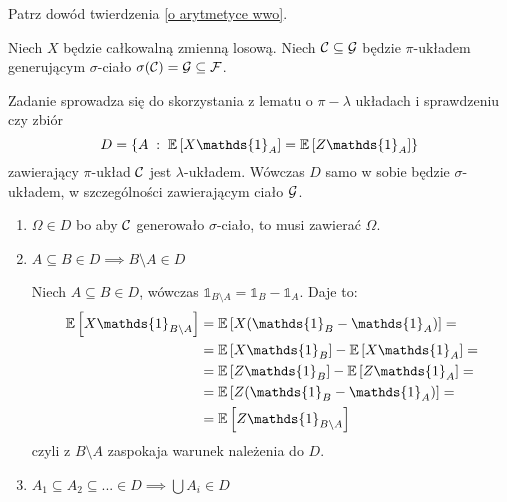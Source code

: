 \begin{solution}
  Patrz dowód twierdzenia \ref{o arytmetyce wwo}.
\end{solution}

\begin{problem}
  Niech $X$ będzie całkowalną zmienną losową. Niech $\mathcal{C}\subseteq\mathcal{G}$ będzie $\pi$-układem generującym $\sigma$-ciało $\sigma(\mathcal{C})=\mathcal{G}\subseteq\mathcal{F}$.
\end{problem}

\begin{solution}
  Zadanie sprowadza się do skorzystania z lematu o $\pi-\lambda$ układach i sprawdzeniu czy zbiór
  $$D=\{A\;:\;\expected{X\mathds{1}_A}=\expected{Z\mathds{1}_A}\}$$
  zawierający $\pi$-układ $\mathcal{C}$ jest $\lambda$-układem. Wówczas $D$ samo w sobie będzie $\sigma$-układem, w szczególności zawierającym ciało $\mathcal{G}$.

  \begin{enumerate}
    \item $\Omega\in D$ bo aby $\mathcal{C}$ generowało $\sigma$-ciało, to musi zawierać $\Omega$.
    \item $A\subseteq B\in D\implies B\setminus A\in D$

      Niech $A\subseteq B\in D$, wówczas $\mathds{1}_{B\setminus A}=\mathds{1}_B-\mathds{1}_A$. Daje to:
      \begin{align*}
        \expected{X\mathds{1}_{B\setminus A}}&=\expected{X(\mathds{1}_B-\mathds{1}_A)}=\\ 
                                             &=\expected{X\mathds{1}_B}-\expected{X\mathds{1}_A}=\\ 
                                             &=\expected{Z\mathds{1}_B}-\expected{Z\mathds{1}_A}=\\ 
                                             &=\expected{Z(\mathds{1}_B-\mathds{1}_A)}=\\ 
                                             &=\expected{Z\mathds{1}_{B\setminus A}}
      \end{align*}
      czyli z $B\setminus A$ zaspokaja warunek należenia do $D$.
    \item $A_1\subseteq A_2\subseteq...\in D\implies\bigcup A_i\in D$
    

\end{enumerate}
\end{solution}

